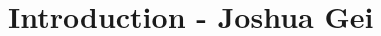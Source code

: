 \documentclass[11pt]{article}		%
\begin{document}
	\setlength{\columnsep}{1.5cm} %
	\setlength{\columnseprule}{0.5pt} %
	
	\begin{multicols*}{2}
		\RaggedRight
	    \tableofcontents
    \end{multicols*}
	
	\setlength{\columnsep}{10pt} %
	\setlength{\columnseprule}{0pt} %
	
	\newpage
    \pagestyle{fancy}
	\setcounter{page}{1}
	

	\section[Introduction]{Introduction - Joshua Gei}
	
\end{document}
